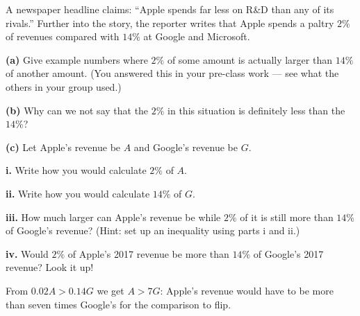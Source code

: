 \documentclass[12pt]{ximera}
\begin{document}
\begin{problem}
A newspaper headline claims: ``Apple spends far less on R\&D than any of its rivals.''
Further into the story, the reporter writes that Apple spends a paltry $2\%$ of
revenues compared with $14\%$ at Google and Microsoft.

\begin{prompt}
\textbf{(a)} Give example numbers where $2\%$ of some amount is actually larger than
$14\%$ of another amount. (You answered this in your pre-class work --- see what the
others in your group used.)
\begin{freeResponse}
\end{freeResponse}
\end{prompt}

\begin{prompt}
\textbf{(b)} Why can we not say that the $2\%$ in this situation is definitely less
than the $14\%$?
\begin{freeResponse}
\end{freeResponse}
\end{prompt}

\begin{prompt}
\textbf{(c)} Let Apple's revenue be $A$ and Google's revenue be $G$.

\textbf{i.} Write how you would calculate $2\%$ of $A$.
\begin{freeResponse}
\end{freeResponse}

\textbf{ii.} Write how you would calculate $14\%$ of $G$.
\begin{freeResponse}
\end{freeResponse}

\textbf{iii.} How much larger can Apple's revenue be while $2\%$ of it is still more
than $14\%$ of Google's revenue? (Hint: set up an inequality using parts i and ii.)
\begin{freeResponse}
\end{freeResponse}

\textbf{iv.} Would $2\%$ of Apple's 2017 revenue be more than $14\%$ of Google's 2017
revenue? Look it up!
\begin{freeResponse}
\end{freeResponse}

\begin{solution}
From $0.02A > 0.14G$ we get $A > 7G$: Apple's revenue would have to be more than
seven times Google's for the comparison to flip.
\end{solution}
\end{prompt}
\end{problem}
\end{document}
